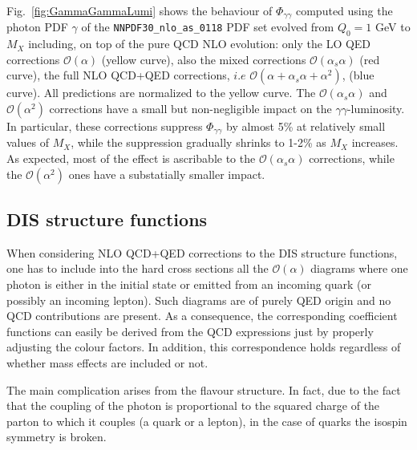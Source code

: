 \begin{widetext}
Fig.~\ref{fig:GammaGammaLumi} shows the behaviour of
$\Phi_{\gamma\gamma}$ computed using the photon PDF $\gamma$ of the
{\tt NNPDF30\_nlo\_as\_0118} PDF set evolved from $Q_0 = 1$ GeV to
$M_X$ including, on top of the pure QCD NLO evolution: only the LO QED
corrections $\mathcal{O}(\alpha)$ (yellow curve), also the mixed
corrections $\mathcal{O}(\alpha_s\alpha)$ (red curve), the full NLO
QCD+QED corrections, $i.e$
$\mathcal{O}(\alpha+\alpha_s\alpha+\alpha^2)$, (blue curve). All
predictions are normalized to the yellow curve. The
$\mathcal{O}(\alpha_s\alpha)$ and $\mathcal{O}(\alpha^2)$ corrections
have a small but non-negligible impact on the
$\gamma\gamma$-luminosity. In particular, these corrections suppress
$\Phi_{\gamma\gamma}$ by almost 5\% at relatively small values of
$M_X$, while the suppression gradually shrinks to 1-2\% as $M_X$
increases. As expected, most of the effect is ascribable to the
$\mathcal{O}(\alpha_s\alpha)$ corrections, while the
$\mathcal{O}(\alpha^2)$ ones have a substatially smaller impact.

\subsection{DIS structure functions}

When considering NLO QCD+QED corrections to the DIS structure
functions, one has to include into the hard cross sections all the
$\mathcal{O}(\alpha)$ diagrams where one photon is either in the
initial state or emitted from an incoming quark (or possibly an
incoming lepton). Such diagrams are of purely QED origin and no QCD
contributions are present. As a consequence, the corresponding
coefficient functions can easily be derived from the QCD expressions
just by properly adjusting the colour factors. In addition, this
correspondence holds regardless of whether mass effects are included
or not.

The main complication arises from the flavour structure. In fact, due
to the fact that the coupling of the photon is proportional to the
squared charge of the parton to which it couples (a quark or a
lepton), in the case of quarks the isospin symmetry is broken.











\end{widetext}